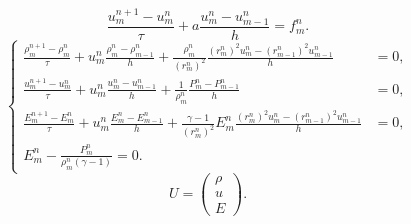 \documentclass[a4paper]{article}
\title{}
\begin{document}
	\maketitle
\[
\frac{u_m^{n+1}-u_m^n}{\tau}+a \frac{u_m^n-u_{m-1}^n}{h}
=f^n_m
.\] 
\[
\left\{
\begin{aligned}
	\frac{\rho_m^{n+1}-\rho_m^n}{\tau}+u_m^n \frac{\rho_m^{n}-\rho_{m-1}^n}{h}+\frac{\rho_m^n}{\left( 
	r_m^n\right) ^2}  \frac{\left(r_m^n  \right)^2u_m^n-\left(r_{m-1}^n  \right)^2u_{m-1}^n}{h}  &=0 ,\\
	\frac{u_m^{n+1}-u_m^n}{\tau}+u_m^n \frac{u_m^{n}-u_{m-1}^n}{h}+\frac{1}{
	\rho_m^n} \frac{P_m^n-P_{m-1}^n}{h}  &=0 ,\\
	\frac{E_m^{n+1}-E_m^n}{\tau}+u_m^n \frac{E_m^{n}-E_{m-1}^n}{h}+\frac{\gamma-1}{\left( 
	r_m^n\right) ^2}E_m^n\frac{\left(r_m^n  \right)^2u_m^n-\left(r_{m-1}^n  \right)^2u_{m-1}^n}{h}&=0 ,\\
	E_m^n-\frac{P_m^n}{\rho_m^n (\gamma-1)}=0.
\end{aligned}
\right.
\] 
\[
U= \begin{pmatrix} \rho \\ u \\ E \end{pmatrix} 
.\] 
\end{document}
